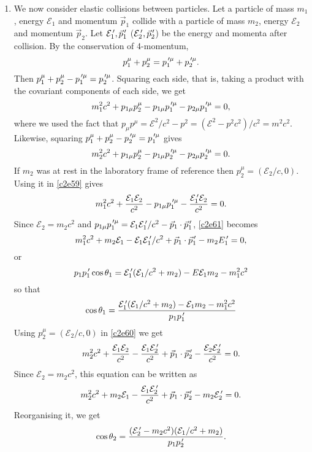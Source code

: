 \begin{enumerate}
\item We now consider elastic collisions between particles. Let a particle of
mass $m_1$, energy $\mathcal{E}_1$ and momentum $\vec{p}_1$ collide with a 
particle of mass $m_2$, energy $\mathcal{E}_2$ and momentum $\vec{p}_2$. Let 
$\mathcal{E}_1^{\,\prime}, \vec{p}_1^{\,\prime}$ ($\mathcal{E}_2^{\,\prime}, \vec{p}_2^{\,\prime}$) be the 
energy and momenta after collision. By the conservation of 4-momentum,
\begin{equation}\label{c2e58}
p_1^\mu + p_2^\mu = p_1^{{\,\prime}\mu} + p_2^{{\,\prime}\mu}.
\end{equation}
Then $p_1^\mu + p_2^\mu - p_1^{{\,\prime}\mu} = p_2^{{\,\prime}\mu}$. Squaring each side, that
is, taking a product with the covariant components of each side, we get
\begin{equation}\label{c2e59}
m_1^2c^2 + p_{1\mu}p_2^\mu - p_{1\mu}p_1^{{\,\prime}\mu} - p_{2\mu}p_1^{{\,\prime}\mu} = 0,
\end{equation}
where we used the fact that $p_\mu p^\mu = \mathcal{E}^2/c^2 - p^2 = 
(\mathcal{E}^2 - p^2c^2)/c^2 = m^2c^2$.
Likewise, squaring $p_1^\mu + p_2^\mu - p_2^{{\,\prime}\mu} = p_1^{{\,\prime}\mu}$ gives
\begin{equation}\label{c2e60}
m_2^2c^2 + p_{1\mu}p_2^\mu - p_{1\mu}p_2^{{\,\prime}\mu} - p_{2\mu}p_2^{{\,\prime}\mu} = 0.
\end{equation}
If $m_2$ was at rest in the laboratory frame of reference then $p_2^\mu = 
(\mathcal{E}_2/c, 0)$. Using it in \eqref{c2e59} gives
\begin{equation}\label{c2e61}
m_1^2c^2 + \frac{\mathcal{E}_1\mathcal{E}_2}{c^2} - p_{1\mu}p_1^{{\,\prime}\mu} 
- \frac{\mathcal{E}_1^{\,\prime} \mathcal{E}_2}{c^2} = 0.
\end{equation}
Since $\mathcal{E}_2 = m_2c^2$ and $p_{1\mu}p_1^{{\,\prime}\mu} = 
\mathcal{E}_1\mathcal{E}_1^{\,\prime}/c^2 - \vec{p}_1\cdot\vec{p}_1^{\,\prime}$, \eqref{c2e61}
becomes
\begin{equation}\label{c2e62}
m_1^2c^2 + m_2\mathcal{E}_1 - \mathcal{E}_1\mathcal{E}_1^{\,\prime}/c^2 + 
\vec{p}_1\cdot\vec{p}_1^{\,\prime} - m_2E_1^{\,\prime} = 0,
\end{equation}
or
\[
p_1p_1^{\,\prime}\cos\theta_1 = \mathcal{E}_1^{\,\prime}(\mathcal{E}_1/c^2 + m_2) - 
E\mathcal{E}_1m_2 - m_1^2c^2
\]
so that
\begin{equation}\label{c2e63}
\cos\theta_1 = \frac{\mathcal{E}_1^{\,\prime}(\mathcal{E}_1/c^2 + m_2) - 
\mathcal{E}_1m_2 - m_1^2c^2}{p_1p_1^{\,\prime}}
\end{equation}
Using $p_2^\mu = (\mathcal{E}_2/c, 0)$ in \eqref{c2e60} we get
\[
m_2^2c^2 + \frac{\mathcal{E}_1\mathcal{E}_2}{c^2} - \frac{\mathcal{E}_1
\mathcal{E}_2^{\,\prime}}{c^2} + 
\vec{p}_1\cdot\vec{p}_2^{\,\prime} - \frac{\mathcal{E}_2\mathcal{E}_2^{\,\prime}}{c^2} = 0.
\]
Since $\mathcal{E}_2 = m_2c^2$, this equation can be written as
\[
m_2^2c^2 + m_2\mathcal{E}_1 - \frac{\mathcal{E}_1\mathcal{E}_2^{\,\prime}}{c^2} + 
\vec{p}_1\cdot\vec{p}_2^{\,\prime} - m_2\mathcal{E}_2^{\,\prime} = 0.
\]
Reorganising it, we get
\begin{equation}\label{c2e64}
\cos\theta_2 = 
\frac{(\mathcal{E}_2^{\,\prime} - m_2c^2)(\mathcal{E}_1/c^2 + m_2)}{p_1p_2^{\,\prime}}.
\end{equation}


\end{enumerate}
